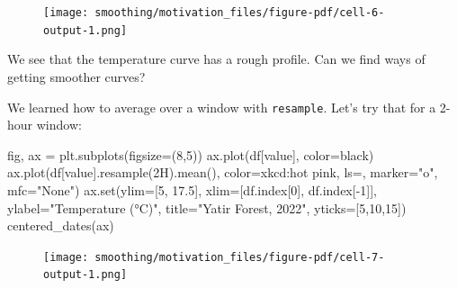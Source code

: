 \documentclass[
  letterpaper,
  DIV=11,
  numbers=noendperiod,
  oneside]{scrreprt}
\newenvironment{Shaded}{\begin{snugshade}}{\end{snugshade}}
\newcommand{\BuiltInTok}[1]{\textcolor[rgb]{0.00,0.23,0.31}{#1}}
\newcommand{\DecValTok}[1]{\textcolor[rgb]{0.68,0.00,0.00}{#1}}
\newcommand{\FloatTok}[1]{\textcolor[rgb]{0.68,0.00,0.00}{#1}}
\newcommand{\NormalTok}[1]{\textcolor[rgb]{0.00,0.23,0.31}{#1}}
\newcommand{\OperatorTok}[1]{\textcolor[rgb]{0.37,0.37,0.37}{#1}}
\newcommand{\StringTok}[1]{\textcolor[rgb]{0.13,0.47,0.30}{#1}}
\begin{document}
\begin{figure}[H]

{\centering \texttt{[image: smoothing/motivation\_files/figure-pdf/cell-6-output-1.png]}

}

\end{figure}

We see that the temperature curve has a rough profile. Can we find ways
of getting smoother curves?

We learned how to average over a window with \texttt{resample}. Let's
try that for a 2-hour window:

\begin{Shaded}
\begin{Highlighting}[]
\NormalTok{fig, ax }\OperatorTok{=}\NormalTok{ plt.subplots(figsize}\OperatorTok{=}\NormalTok{(}\DecValTok{8}\NormalTok{,}\DecValTok{5}\NormalTok{))}
\NormalTok{ax.plot(df[}\StringTok{\textquotesingle{}value\textquotesingle{}}\NormalTok{], color}\OperatorTok{=}\StringTok{\textquotesingle{}black\textquotesingle{}}\NormalTok{)}
\NormalTok{ax.plot(df[}\StringTok{\textquotesingle{}value\textquotesingle{}}\NormalTok{].resample(}\StringTok{\textquotesingle{}2H\textquotesingle{}}\NormalTok{).mean(),}
\NormalTok{        color}\OperatorTok{=}\StringTok{\textquotesingle{}xkcd:hot pink\textquotesingle{}}\NormalTok{, ls}\OperatorTok{=}\StringTok{\textquotesingle{}{-}\textquotesingle{}}\NormalTok{,}
\NormalTok{        marker}\OperatorTok{=}\StringTok{"o"}\NormalTok{, mfc}\OperatorTok{=}\StringTok{"None"}\NormalTok{)}
\NormalTok{ax.}\BuiltInTok{set}\NormalTok{(ylim}\OperatorTok{=}\NormalTok{[}\DecValTok{5}\NormalTok{, }\FloatTok{17.5}\NormalTok{],}
\NormalTok{       xlim}\OperatorTok{=}\NormalTok{[df.index[}\DecValTok{0}\NormalTok{], df.index[}\OperatorTok{{-}}\DecValTok{1}\NormalTok{]],}
\NormalTok{       ylabel}\OperatorTok{=}\StringTok{"Temperature (°C)"}\NormalTok{,}
\NormalTok{       title}\OperatorTok{=}\StringTok{"Yatir Forest, 2022"}\NormalTok{,}
\NormalTok{       yticks}\OperatorTok{=}\NormalTok{[}\DecValTok{5}\NormalTok{,}\DecValTok{10}\NormalTok{,}\DecValTok{15}\NormalTok{])}
\NormalTok{centered\_dates(ax)}
\end{Highlighting}
\end{Shaded}

\begin{figure}[H]

{\centering \texttt{[image: smoothing/motivation\_files/figure-pdf/cell-7-output-1.png]}

}

\end{figure}
\end{document}

